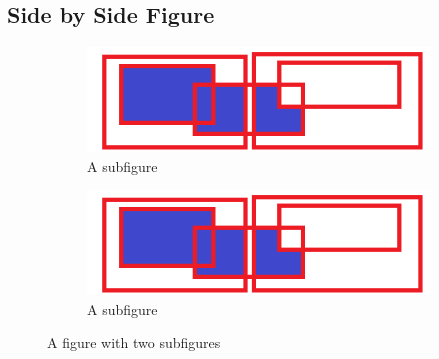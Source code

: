 \documentclass{article}
\begin{document}
\subsection{Side by Side Figure}

\begin{figure}
\centering
\begin{subfigure}{.5\textwidth}
  \centering
  \includegraphics[width=.4\linewidth]{nastyExample}
  \caption{A subfigure}
  \label{fig:sub1}
\end{subfigure}%
\begin{subfigure}{.5\textwidth}
  \centering
  \includegraphics[width=.4\linewidth]{nastyExample}
  \caption{A subfigure}
  \label{fig:sub2}
\end{subfigure}
\caption{A figure with two subfigures}
\label{fig:test}
\end{figure}
\end{document}
